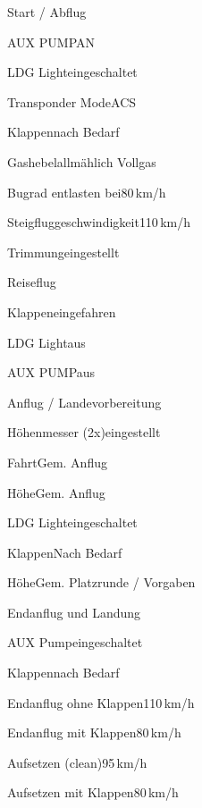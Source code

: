 \begin{checklist}{Start / Abflug}
	  \item{AUX PUMP}{AN}
	  \item{LDG Light}{eingeschaltet}
	  \item{Transponder Mode}{ACS}
	  \item{Klappen}{nach Bedarf}
	  \item{Gashebel}{allmählich Vollgas}
	\item{Bugrad entlasten bei}{80\,km/h}
	\item{Steigfluggeschwindigkeit}{110\,km/h}
	\item{Trimmung}{eingestellt}
\end{checklist}
	
\begin{checklist}{Reiseflug}
	\item{Klappen}{eingefahren}
	\item{LDG Light}{aus}
	\item{AUX PUMP}{aus}
\end{checklist}

\begin{checklist}{Anflug / Landevorbereitung}
	\item{Höhenmesser (2x)}{eingestellt}
	\item{Fahrt}{Gem. Anflug}
	\item{Höhe}{Gem. Anflug}
	\item{LDG Light}{eingeschaltet}
	\item{Klappen}{Nach Bedarf}
	\item{Höhe}{Gem. Platzrunde / Vorgaben}
\end{checklist}

\begin{checklist}{Endanflug und Landung}
	\item{AUX Pump}{eingeschaltet}
	\item{Klappen}{nach Bedarf}
	\item{Endanflug ohne Klappen}{110\,km/h}
	\item{Endanflug mit Klappen}{80\,km/h}
	\item{Aufsetzen (clean)}{95\,km/h}
	\item{Aufsetzen mit Klappen}{80\,km/h}
\end{checklist}

